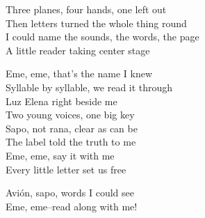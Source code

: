 \begin{lyrics}
Three planes, four hands, one left out\\
Then letters turned the whole thing round\\
I could name the sounds, the words, the page\\
A little reader taking center stage

Eme, eme, that's the name I knew\\
Syllable by syllable, we read it through\\
Luz Elena right beside me\\
Two young voices, one big key\\
Sapo, not rana, clear as can be\\
The label told the truth to me\\
Eme, eme, say it with me\\
Every little letter set us free

Avión, sapo, words I could see\\
Eme, eme--read along with me!
\end{lyrics}

